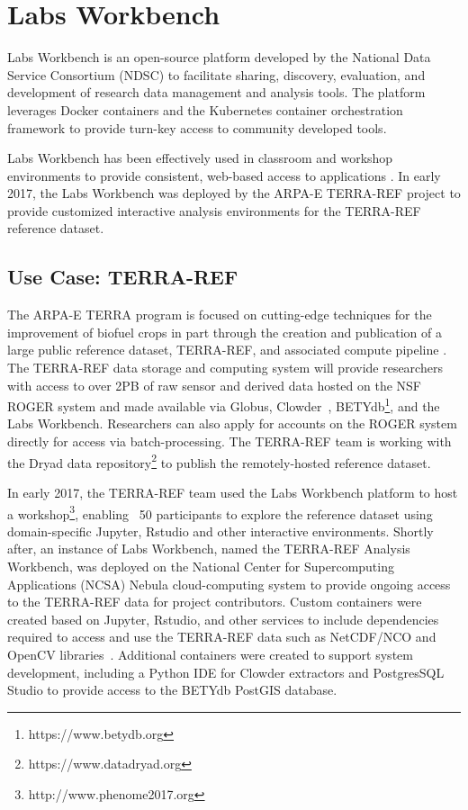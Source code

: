 \documentclass{sig-alternate}
\begin{document}
\section{Labs Workbench}

Labs Workbench is an open-source platform developed by the National Data Service Consortium (NDSC) to facilitate sharing, discovery, evaluation, and development of research data management and analysis tools. The platform leverages Docker containers and the Kubernetes container orchestration framework to provide turn-key access to community developed tools. 

Labs Workbench has been effectively used in classroom and workshop environments to provide consistent, web-based access to applications \cite{ndsphenome}. In early 2017, the Labs Workbench was deployed by the ARPA-E TERRA-REF project to provide customized interactive analysis environments for the TERRA-REF reference dataset. 

\subsection{Use Case: TERRA-REF}

The ARPA-E TERRA program is focused on cutting-edge techniques for the improvement of biofuel crops in part through the creation and publication of a large public reference dataset, TERRA-REF, and associated compute pipeline \cite{arpae2015}. The TERRA-REF data storage and computing system will provide researchers with access to over 2PB of raw sensor and derived data hosted on the NSF ROGER system and made available via Globus, Clowder~\cite{Marini10,Sophocleous17}, BETYdb\footnote{https://www.betydb.org}, and the Labs Workbench. Researchers can also apply for accounts on the ROGER system directly for access via batch-processing. The TERRA-REF team is working with the Dryad data repository\footnote{https://www.datadryad.org} to publish the remotely-hosted reference dataset.

In early 2017, the TERRA-REF team used the Labs Workbench platform to host a workshop\footnote{http://www.phenome2017.org}, enabling ~50 participants to explore the reference dataset using domain-specific Jupyter, Rstudio and other interactive environments. Shortly after, an instance of Labs Workbench, named the TERRA-REF Analysis Workbench, was deployed on the National Center for Supercomputing Applications (NCSA) Nebula cloud-computing system to provide ongoing access to the TERRA-REF data for project contributors. Custom containers were created based on Jupyter, Rstudio, and other services to include dependencies required to access and use the TERRA-REF data such as NetCDF/NCO and OpenCV libraries~\cite{Kaebler}.  Additional containers were created to support system development, including a Python IDE for Clowder extractors and PostgresSQL Studio to provide access to the BETYdb PostGIS database.
\end{document}
